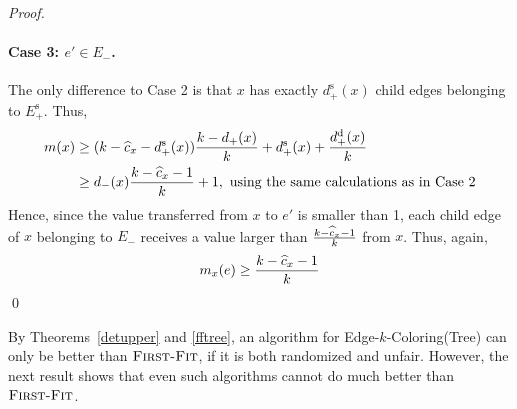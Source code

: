 \documentclass[smallextended]{svjour3}
\def\mctree{{\sc Edge-$k$-Coloring(Tree)}\xspace}
\newcommand{\er}{\ensuremath{E_{-}}\xspace}
\newcommand{\es}{\ensuremath{E_{+}^{\text{s}}}\xspace}
\def\dc{d_{+}}
\def\dd{d_{+}^{\text{d}}}
\def\dr{d_{-}}
\def\ds{d_{+}^{\text{s}}}
\newcommand{\FF}{\ensuremath{\operatorname{\textsc{First-Fit}}}\xspace}
\begin{document}
\begin{proof}
\paragraph{Case 3: $e'\in\er$.}
The only difference to Case 2 is that $x$ has exactly $\ds(x)$ child
 edges belonging to $\es$.
Thus,
\begin{align*}
m(x)
& \geq (k-\cmis-\ds(x))\frac{k-\dc(x)}{k} + \ds(x) + \frac{\dd(x)}{k}\\
& \geq \dr(x)\frac{k-\cmis-1}{k} +1, 
       \text{ using the same calculations as in Case 2} 
\end{align*}
Hence, since the value transferred from $x$ to $e'$ is smaller than 1,
 each child edge of $x$ belonging to $E_-$ receives a value larger than
 $\frac{k-\widehat{c}_x-1}{k}$ from $x$.
Thus, again,
\begin{equation*}
m_x(e) \geq \frac{k-\widehat{c}_x-1}{k}
\end{equation*}
\mbox{}\qed\end{proof}

By Theorems~\ref{detupper} and \ref{fftree}, an algorithm for \mctree
 can only be better than \FF, if it is both randomized and unfair.
However, the next result shows that even such algorithms cannot do much better than \FF.
\end{document}
